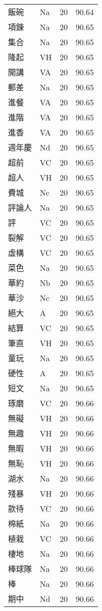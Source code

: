 \documentclass[twocolumn]{book}
\begin{document}
\begin{supertabular}{llrr}
飯碗 & Na & 20 &  90.64\\
項鍊 & Na & 20 &  90.65\\
集合 & Na & 20 &  90.65\\
隆起 & VH & 20 &  90.65\\
開講 & VA & 20 &  90.65\\
郵差 & Na & 20 &  90.65\\
進餐 & VA & 20 &  90.65\\
進階 & VA & 20 &  90.65\\
進香 & VA & 20 &  90.65\\
週年慶 & Nd & 20 &  90.65\\
超前 & VC & 20 &  90.65\\
超人 & VH & 20 &  90.65\\
費城 & Nc & 20 &  90.65\\
評論人 & Na & 20 &  90.65\\
評 & VC & 20 &  90.65\\
裂解 & VC & 20 &  90.65\\
虛構 & VC & 20 &  90.65\\
菜色 & Na & 20 &  90.65\\
華約 & Nb & 20 &  90.65\\
華沙 & Nc & 20 &  90.65\\
絕大 & A & 20 &  90.65\\
結算 & VC & 20 &  90.65\\
筆直 & VH & 20 &  90.65\\
童玩 & Na & 20 &  90.65\\
硬性 & A & 20 &  90.65\\
短文 & Na & 20 &  90.65\\
琢磨 & VC & 20 &  90.66\\
無礙 & VH & 20 &  90.66\\
無趣 & VH & 20 &  90.66\\
無暇 & VH & 20 &  90.66\\
無恥 & VH & 20 &  90.66\\
湖水 & Na & 20 &  90.66\\
殘暴 & VH & 20 &  90.66\\
款待 & VC & 20 &  90.66\\
棉紙 & Na & 20 &  90.66\\
植栽 & VC & 20 &  90.66\\
棲地 & Na & 20 &  90.66\\
棒球隊 & Na & 20 &  90.66\\
棒 & Na & 20 &  90.66\\
期中 & Nd & 20 &  90.66\\

\end{supertabular}
\end{document}
